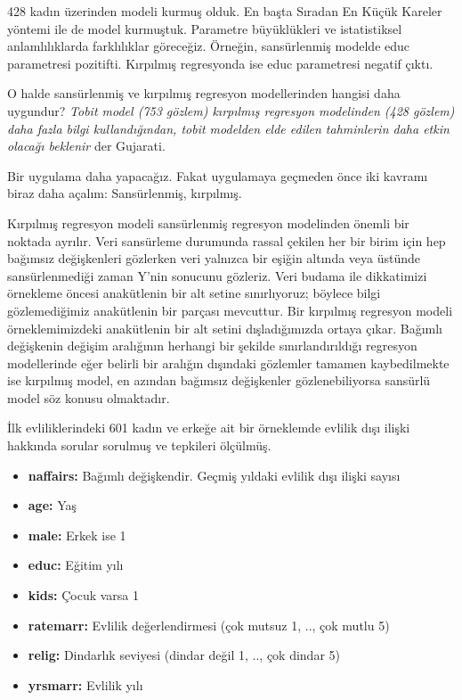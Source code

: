 \documentclass[
]{book}
\newenvironment{Shaded}{\begin{snugshade}}{\end{snugshade}}
\newcommand{\KeywordTok}[1]{\textcolor[rgb]{0.13,0.29,0.53}{\textbf{#1}}}
\newcommand{\NormalTok}[1]{#1}
\newcommand{\OperatorTok}[1]{\textcolor[rgb]{0.81,0.36,0.00}{\textbf{#1}}}
\newcommand{\StringTok}[1]{\textcolor[rgb]{0.31,0.60,0.02}{#1}}
\begin{document}
428 kadın üzerinden modeli kurmuş olduk. En başta Sıradan En Küçük Kareler yöntemi ile de model kurmuştuk. Parametre büyüklükleri ve istatistiksel anlamlılıklarda farklılıklar göreceğiz. Örneğin, sansürlenmiş modelde educ parametresi pozitifti. Kırpılmış regresyonda ise educ parametresi negatif çıktı.

O halde sansürlenmiş ve kırpılmış regresyon modellerinden hangisi daha uygundur? \emph{Tobit model (753 gözlem) kırpılmış regresyon modelinden (428 gözlem) daha fazla bilgi kullandığından, tobit modelden elde edilen tahminlerin daha etkin olacağı beklenir} der Gujarati.

Bir uygulama daha yapacağız. Fakat uygulamaya geçmeden önce iki kavramı biraz daha açalım: Sansürlenmiş, kırpılmış.

Kırpılmış regresyon modeli sansürlenmiş regresyon modelinden önemli bir noktada ayrılır. Veri sansürleme durumunda rassal çekilen her bir birim için hep bağımsız değişkenleri gözlerken veri yalnızca bir eşiğin altında veya üstünde sansürlenmediği zaman Y'nin sonucunu gözleriz. Veri budama ile dikkatimizi örnekleme öncesi anakütlenin bir alt setine sınırlıyoruz; böylece bilgi gözlemediğimiz anakütlenin bir parçası mevcuttur. Bir kırpılmış regresyon modeli örneklemimizdeki anakütlenin bir alt setini dışladığımızda ortaya çıkar. Bağımlı değişkenin değişim aralığının herhangi bir şekilde sınırlandırıldığı regresyon modellerinde eğer belirli bir aralığın dışındaki gözlemler tamamen kaybedilmekte ise kırpılmış model, en azından bağımsız değişkenler gözlenebiliyorsa sansürlü model söz konusu olmaktadır.

İlk evliliklerindeki 601 kadın ve erkeğe ait bir örneklemde evlilik dışı ilişki hakkında sorular sorulmuş ve tepkileri ölçülmüş.

\begin{Shaded}
\end{Shaded}

\begin{itemize}
\item
  \textbf{naffairs:} Bağımlı değişkendir. Geçmiş yıldaki evlilik dışı ilişki sayısı
\item
  \textbf{age:} Yaş
\item
  \textbf{male:} Erkek ise 1
\item
  \textbf{educ:} Eğitim yılı
\item
  \textbf{kids:} Çocuk varsa 1
\item
  \textbf{ratemarr:} Evlilik değerlendirmesi (çok mutsuz 1, .., çok mutlu 5)
\item
  \textbf{relig:} Dindarlık seviyesi (dindar değil 1, .., çok dindar 5)
\item
  \textbf{yrsmarr:} Evlilik yılı
\end{itemize}
\end{document}
